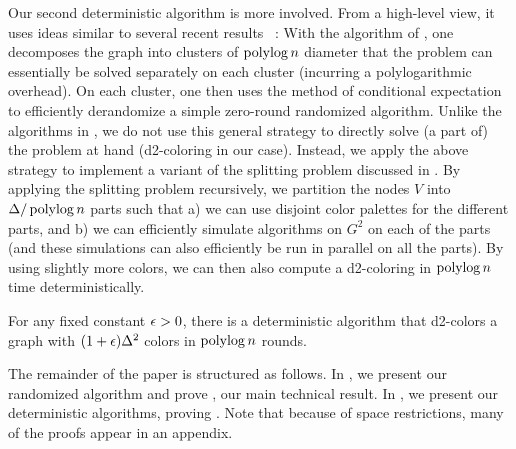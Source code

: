 Our second deterministic algorithm is more involved. From a high-level view, it uses ideas similar to several recent \CONGEST results ~\cite{det_congest_coloring,CPS17,DKM19,DISC18_DomSet}: 
With the algorithm of \cite{RG19}, one decomposes the graph into clusters of $\operatorname{polylog} n$ diameter that the problem can essentially be solved separately on each cluster (incurring a polylogarithmic overhead). On each cluster, one then uses the method of conditional expectation to efficiently derandomize a simple zero-round randomized algorithm. Unlike the algorithms in \cite{det_congest_coloring,CPS17,DKM19,DISC18_DomSet}, we do not use this general strategy to directly solve (a part of) the problem at hand (d2-coloring in our case). Instead, we apply the above strategy to implement a variant of the splitting problem discussed in \cite{BambergerGKMU19,stoc17_complexity}. By applying the splitting problem recursively, we partition the nodes $V$ into $\Delta/\operatorname{polylog} n$ parts such that a) we can use disjoint color palettes for the different parts, and b) we can efficiently simulate \CONGEST algorithms on $G^2$ on each of the parts (and these \CONGEST simulations can also efficiently be run in parallel on all the parts). By using slightly more colors, we can then also compute a d2-coloring in $\operatorname{polylog} n$ time deterministically.

\begin{theorem}[Simplified]
\label{thm:G2withSplitting}
For any fixed constant $\epsilon>0$, there is a deterministic \CONGEST algorithm that d2-colors a graph with $(1+\epsilon)\Delta^2$ colors in $\operatorname{polylog} n$ rounds.
\end{theorem}


The remainder of the paper is structured as follows. In , we present our randomized algorithm and prove , our main technical result. In , we present our deterministic algorithms, proving . Note that because of space restrictions, many of the proofs appear in an appendix. 

